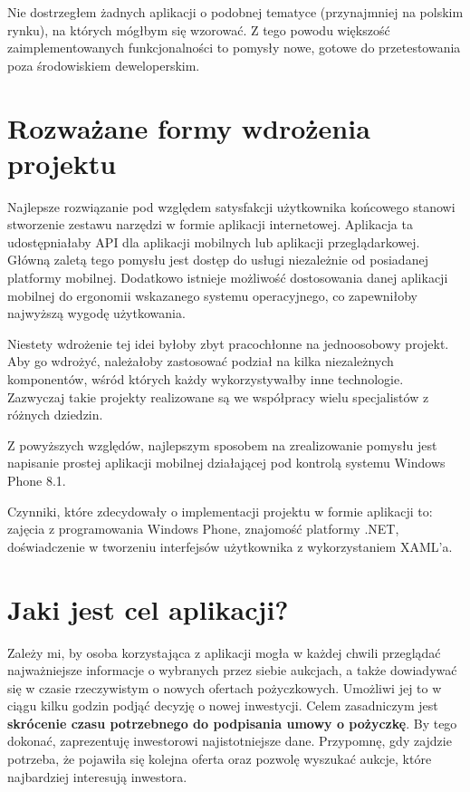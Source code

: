 \documentclass[a4paper,twoside,titlepage,openright]{book}
\begin{document}
Nie dostrzegłem żadnych aplikacji o podobnej tematyce (przynajmniej na polskim rynku), na których mógłbym się wzorować. Z tego powodu większość zaimplementowanych funkcjonalności to pomysły nowe, gotowe do przetestowania poza środowiskiem deweloperskim.

\section*{Rozważane formy wdrożenia projektu}

Najlepsze rozwiązanie pod względem satysfakcji użytkownika końcowego stanowi stworzenie zestawu narzędzi w formie aplikacji internetowej. Aplikacja ta udostępniałaby API dla aplikacji mobilnych lub aplikacji przeglądarkowej. Główną zaletą tego pomysłu jest dostęp do usługi niezależnie od posiadanej platformy mobilnej. Dodatkowo istnieje możliwość dostosowania danej aplikacji mobilnej do ergonomii wskazanego systemu operacyjnego, co zapewniłoby najwyższą wygodę użytkowania. 

Niestety wdrożenie tej idei byłoby zbyt pracochłonne na jednoosobowy projekt. Aby go wdrożyć, należałoby zastosować podział na kilka niezależnych komponentów, wśród których każdy wykorzystywałby inne technologie. Zazwyczaj takie projekty realizowane są we współpracy wielu specjalistów z różnych dziedzin.

Z powyższych względów, najlepszym sposobem na zrealizowanie pomysłu jest napisanie prostej aplikacji mobilnej działającej pod kontrolą systemu Windows Phone 8.1. 

Czynniki, które zdecydowały o implementacji projektu w formie aplikacji to: zajęcia z programowania Windows Phone, znajomość platformy .NET, doświadczenie w tworzeniu interfejsów użytkownika z wykorzystaniem XAML'a.

\section*{Jaki jest cel aplikacji?}

Zależy mi, by osoba korzystająca z aplikacji mogła w każdej chwili przeglądać najważniejsze informacje o wybranych przez siebie aukcjach, a także dowiadywać się w czasie rzeczywistym o nowych ofertach pożyczkowych. Umożliwi jej to w ciągu kilku godzin podjąć decyzję o nowej inwestycji. Celem zasadniczym jest \textbf{skrócenie czasu potrzebnego do podpisania umowy o pożyczkę}. By tego dokonać, zaprezentuję inwestorowi najistotniejsze dane. Przypomnę, gdy zajdzie potrzeba, że pojawiła się kolejna oferta oraz pozwolę wyszukać aukcje, które najbardziej interesują inwestora.
\end{document}

